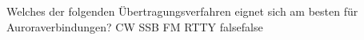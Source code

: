     {Welches der folgenden Übertragungsverfahren eignet sich am besten für Auroraverbindungen?}
    {CW}
    {SSB}
    {FM}
    {RTTY}
    {false}{false}